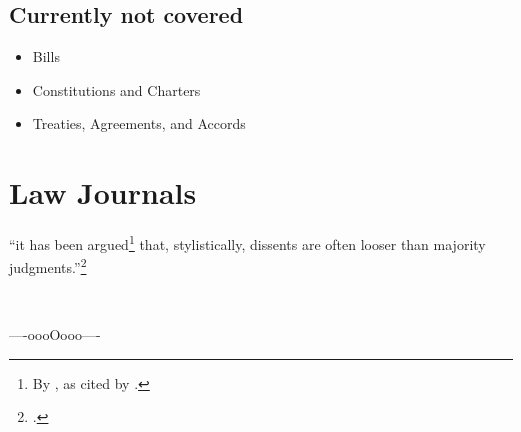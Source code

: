 
\subsection{Currently not covered}
\begin{itemize}
\item Bills
\item Constitutions and Charters
\item Treaties, Agreements, and Accords
\end{itemize}


\section{Law Journals}


``it has been argued\footnote{By , as cited by .} that, stylistically,
dissents are often looser than majority judgments.''\footnote{.}\bigskip 



\bigskip
\hfill{}\hfill\ %
\bigskip
%
\printbibliography[
	nottype=case,
	nottype=statute,
	notkeyword=lj,
		]
\printindex


%
\bigskip 

\hfill ----oooOooo---- \hfill\ 
